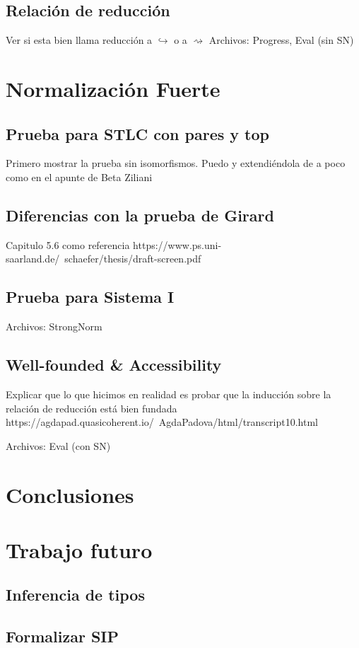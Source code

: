 \documentclass[]{report}
\begin{document}
	
	\subsection{Relación de reducción}
	Ver si esta bien llama reducción a $\hookrightarrow$ o a $\rightsquigarrow$
	Archivos: Progress, Eval (sin SN)
	
	\section{Normalización Fuerte}
	
	\subsection{Prueba para STLC con pares y top}
	Primero mostrar la prueba sin isomorfismos. Puedo y extendiéndola de a poco como en el apunte de Beta Ziliani
	\subsection{Diferencias con la prueba de Girard}
	Capitulo 5.6 como referencia
	https://www.ps.uni-saarland.de/~schaefer/thesis/draft-screen.pdf

	\subsection{Prueba para Sistema I}
	
	Archivos: StrongNorm
	
	\subsection{Well-founded \& Accessibility}
	Explicar que lo que hicimos en realidad es probar que la inducción sobre la relación de reducción está bien fundada
	https://agdapad.quasicoherent.io/~AgdaPadova/html/transcript10.html
	
	Archivos: Eval (con SN)
	
	\section{Conclusiones}
	
	
	\section{Trabajo futuro}
	\subsection{Inferencia de tipos}
	\subsection{Formalizar SIP}
	
	
	\printbibliography
	
\end{document}
